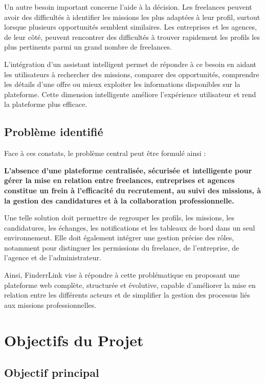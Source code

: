 Un autre besoin important concerne l’aide à la décision. Les freelances peuvent avoir des difficultés à identifier les missions les plus adaptées à leur profil, surtout lorsque plusieurs opportunités semblent similaires. Les entreprises et les agences, de leur côté, peuvent rencontrer des difficultés à trouver rapidement les profils les plus pertinents parmi un grand nombre de freelances.

L’intégration d’un assistant intelligent permet de répondre à ce besoin en aidant les utilisateurs à rechercher des missions, comparer des opportunités, comprendre les détails d’une offre ou mieux exploiter les informations disponibles sur la plateforme. Cette dimension intelligente améliore l’expérience utilisateur et rend la plateforme plus efficace.

\subsection{Problème identifié}

Face à ces constats, le problème central peut être formulé ainsi :

\textbf{L’absence d’une plateforme centralisée, sécurisée et intelligente pour gérer la mise en relation entre freelances, entreprises et agences constitue un frein à l’efficacité du recrutement, au suivi des missions, à la gestion des candidatures et à la collaboration professionnelle.}

Une telle solution doit permettre de regrouper les profils, les missions, les candidatures, les échanges, les notifications et les tableaux de bord dans un seul environnement. Elle doit également intégrer une gestion précise des rôles, notamment pour distinguer les permissions du freelance, de l’entreprise, de l’agence et de l’administrateur.

Ainsi, FinderrLink vise à répondre à cette problématique en proposant une plateforme web complète, structurée et évolutive, capable d’améliorer la mise en relation entre les différents acteurs et de simplifier la gestion des processus liés aux missions professionnelles.
\section{Objectifs du Projet}

\subsection{Objectif principal}

